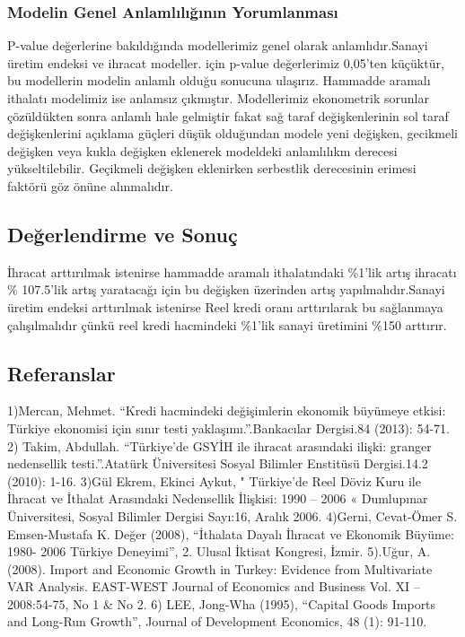 \documentclass[]{article}
\begin{document}
\subsubsection{Modelin Genel Anlamlılığının
Yorumlanması}\label{modelin-genel-anlamllgnn-yorumlanmas}

P-value değerlerine bakıldığında modellerimiz genel olarak
anlamlıdır.Sanayi üretim endeksi ve ihracat modeller. için p-value
değerlerimiz 0,05'ten küçüktür, bu modellerin modelin anlamlı olduğu
sonucuna ulaşırız. Hammadde aramalı ithalatı modelimiz ise anlamsız
çıkmıştır. Modellerimiz ekonometrik sorunlar çözüldükten sonra anlamlı
hale gelmiştir fakat sağ taraf değişkenlerinin sol taraf değişkenlerini
açıklama güçleri düşük olduğundan modele yeni değişken, gecikmeli
değişken veya kukla değişken eklenerek modeldeki anlamlılıkm derecesi
yükseltilebilir. Geçikmeli değişken eklenirken serbestlik derecesinin
erimesi faktörü göz önüne alınmalıdır.

\subsection{Değerlendirme ve Sonuç}\label{degerlendirme-ve-sonuc}

İhracat arttırılmak istenirse hammadde aramalı ithalatındaki \%1'lik
artış ihracatı \% 107.5'lik artış yaratacağı için bu değişken üzerinden
artış yapılmalıdır.Sanayi üretim endeksi arttırılmak istenirse Reel
kredi oranı arttırılarak bu sağlanmaya çalışılmalıdır çünkü reel kredi
hacmindeki \%1'lik sanayi üretimini \%150 arttırır.

\subsection{Referanslar}\label{referanslar}

1)Mercan, Mehmet. ``Kredi hacmindeki değişimlerin ekonomik büyümeye
etkisi: Türkiye ekonomisi için sınır testi yaklaşımı.''.Bankacılar
Dergisi.84 (2013): 54-71. 2) Takim, Abdullah. ``Türkiye'de GSYİH ile
ihracat arasındaki ilişki: granger nedensellik testi.''.Atatürk
Üniversitesi Sosyal Bilimler Enstitüsü Dergisi.14.2 (2010): 1-16. 3)Gül
Ekrem, Ekinci Aykut, " Türkiye'de Reel Döviz Kuru ile İhracat ve İthalat
Arasındaki Nedensellik İlişkisi: 1990 -- 2006 « Dumlupınar Üniversitesi,
Sosyal Bilimler Dergisi Sayı:16, Aralık 2006. 4)Gerni, Cevat-Ömer S.
Emsen-Mustafa K. Değer (2008), ``İthalata Dayalı İhracat ve Ekonomik
Büyüme: 1980- 2006 Türkiye Deneyimi'', 2. Ulusal İktisat Kongresi,
İzmir. 5).Uğur, A. (2008). Import and Economic Growth in Turkey:
Evidence from Multivariate VAR Analysis. EAST-WEST Journal of Economics
and Business Vol. XI -- 2008:54-75, No 1 \& No 2. 6) LEE, Jong-Wha
(1995), ``Capital Goods Imports and Long-Run Growth'', Journal of
Development Economics, 48 (1): 91-110.
\end{document}
